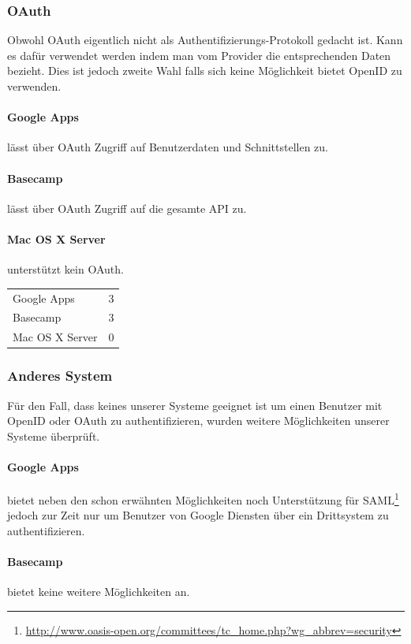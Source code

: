 \subsubsection{OAuth}
\label{ssub:Bewertung OAuth}
Obwohl OAuth eigentlich nicht als Authentifizierungs-Protokoll gedacht ist. Kann es dafür verwendet werden indem man vom Provider die entsprechenden Daten bezieht. Dies ist jedoch zweite Wahl falls sich keine Möglichkeit bietet OpenID zu verwenden.
\paragraph{Google Apps}
\label{par:2.2Google Apps}
lässt über OAuth Zugriff auf Benutzerdaten und Schnittstellen zu.
\paragraph{Basecamp}
\label{par:2.2Basecamp}
lässt über OAuth Zugriff auf die gesamte API zu.
\paragraph{Mac OS X Server}
\label{par:2.2Mac OS X Server}
unterstützt kein OAuth.

\begin{tabular}{lc}
Google Apps & 3\\
Basecamp & 3\\
Mac OS X Server & 0\\
\end{tabular}

\subsubsection{Anderes System}
\label{ssub:Anderes System}
Für den Fall, dass keines unserer Systeme geeignet ist um einen Benutzer mit OpenID oder OAuth zu authentifizieren, wurden weitere Möglichkeiten unserer Systeme überprüft.
\paragraph{Google Apps}
\label{par:2.3Google Apps}
bietet neben den schon erwähnten Möglichkeiten noch Unterstützung für SAML\footnote{\url{http://www.oasis-open.org/committees/tc_home.php?wg_abbrev=security}} jedoch zur Zeit nur um Benutzer von Google Diensten über ein Drittsystem zu authentifizieren.
\paragraph{Basecamp}
\label{par:2.3Basecamp}
bietet keine weitere Möglichkeiten an.
